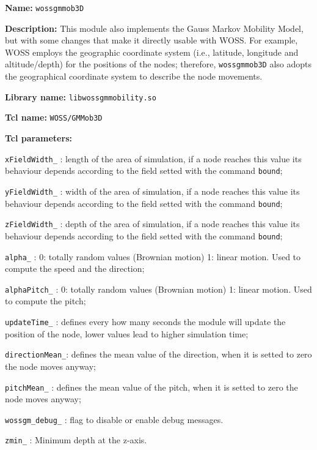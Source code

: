 \begin{description}
   \item {\bf Name:} {\tt wossgmmob3D}
   \item {\bf Description:} This module also implements the Gauss Markov Mobility Model, but with some changes that make it directly usable with WOSS. For example, WOSS employs the geographic coordinate system (i.e., latitude, longitude and altitude/depth) for the positions of the nodes; therefore, {\tt wossgmmob3D} also adopts the geographical coordinate system to describe the node movements.
   \item {\bf Library name:} {\tt libwossgmmobility.so}
   \item {\bf Tcl name:} {\tt WOSS/GMMob3D}
   \item {\bf Tcl parameters:} 
    \begin{description}
      \item {\tt xFieldWidth\_} : length of the area of simulation, if a node reaches this value its behaviour depends according to the field setted with the command {\tt bound};
      \item {\tt yFieldWidth\_} : width of the area of simulation, if a node reaches this value its behaviour depends according to the field setted with the command {\tt bound};
      \item {\tt zFieldWidth\_} : depth of the area of simulation, if a node reaches this value its behaviour depends according to the field setted with the command {\tt bound};
      \item {\tt alpha\_} : 0: totally random values (Brownian motion) 1: linear motion. Used to compute the speed and the direction;
      \item {\tt alphaPitch\_} : 0: totally random values (Brownian motion) 1: linear motion. Used to compute the pitch;
      \item {\tt updateTime\_} : defines every how many seconds the module will update the position of the node, lower values lead to higher simulation time;
      \item {\tt directionMean\_}: defines the mean value of the direction, when it is setted to zero the node moves anyway;
      \item {\tt pitchMean\_} : defines the mean value of the pitch, when it is setted to zero the node moves anyway;
      \item {\tt wossgm\_debug\_} : flag to disable or enable debug messages.
      \item {\tt zmin\_} : Minimum depth at the z-axis.

\end{description}
\end{description}
